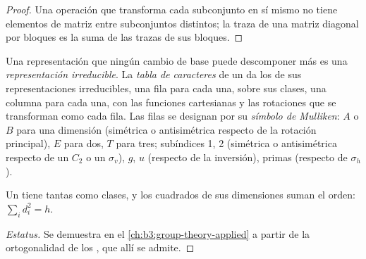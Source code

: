 \begin{proof}
Una operación que transforma cada subconjunto en sí mismo no tiene elementos de matriz
entre subconjuntos distintos; la traza de una matriz diagonal por bloques es la suma
de las trazas de sus bloques.
\end{proof}

\begin{definition}\label{def:b3:point-groups:irrep}
Una representación que ningún cambio de base puede descomponer más es una
\emph{representación irreducible}. La
\emph{tabla de caracteres} de un  da los
 de sus representaciones irreducibles, una fila para cada una, sobre sus clases,
una columna para cada una, con las funciones cartesianas y las rotaciones que se transforman
como cada fila. Las filas se designan por su \emph{símbolo de
Mulliken}: $A$ o $B$ para una dimensión (simétrica o
antisimétrica respecto de la rotación principal), $E$ para dos, $T$ para tres;
subíndices 1, 2 (simétrica o antisimétrica respecto de un $C_2$ o un $\sigma_v$), $g$, $u$
(respecto de la inversión), primas (respecto de $\sigma_h$).
\end{definition}

\begin{proposition}\label{prop:b3:point-groups:irrep-count}
Un  tiene tantas  como clases, y los
cuadrados de sus dimensiones suman el orden: $\sum_id_i^2 = h$.
\end{proposition}
\begin{proof}[Estatus]
Se demuestra en el \cref{ch:b3:group-theory-applied} a partir de la ortogonalidad de los
, que allí se admite.
\end{proof}

